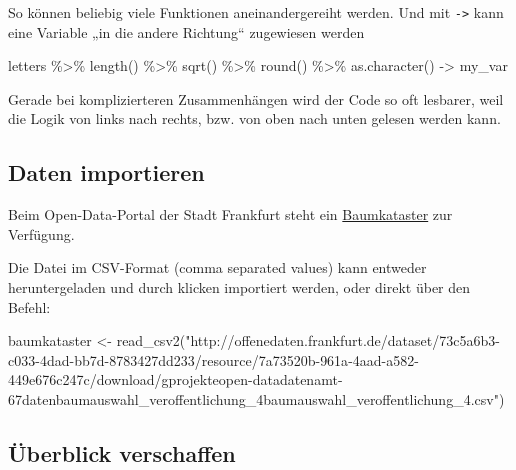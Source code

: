 \documentclass[11pt,german,a4paper]{article}
\newenvironment{Shaded}{\begin{snugshade}}{\end{snugshade}}
\newcommand{\FunctionTok}[1]{\textcolor[rgb]{0.00,0.00,0.00}{#1}}
\newcommand{\NormalTok}[1]{#1}
\newcommand{\OtherTok}[1]{\textcolor[rgb]{0.56,0.35,0.01}{#1}}
\newcommand{\SpecialCharTok}[1]{\textcolor[rgb]{0.00,0.00,0.00}{#1}}
\newcommand{\StringTok}[1]{\textcolor[rgb]{0.31,0.60,0.02}{#1}}
\begin{document}
So können beliebig viele Funktionen aneinandergereiht werden. Und mit \texttt{-\textgreater{}} kann eine Variable „in die andere Richtung`` zugewiesen werden

\begin{Shaded}
\begin{Highlighting}[]
\NormalTok{letters }\SpecialCharTok{\%\textgreater{}\%}
  \FunctionTok{length}\NormalTok{() }\SpecialCharTok{\%\textgreater{}\%}
  \FunctionTok{sqrt}\NormalTok{() }\SpecialCharTok{\%\textgreater{}\%}
  \FunctionTok{round}\NormalTok{() }\SpecialCharTok{\%\textgreater{}\%}
  \FunctionTok{as.character}\NormalTok{() }\OtherTok{{-}\textgreater{}}
\NormalTok{  my\_var}
\end{Highlighting}
\end{Shaded}

Gerade bei komplizierteren Zusammenhängen wird der Code so oft lesbarer, weil die Logik von links nach rechts, bzw. von oben nach unten gelesen werden kann.

\hypertarget{daten-importieren}{%
\subsection{Daten importieren}\label{daten-importieren}}

Beim Open-Data-Portal der Stadt Frankfurt steht ein \href{http://offenedaten.frankfurt.de/dataset/baumkataster-frankfurt-am-main}{Baumkataster} zur Verfügung.

Die Datei im CSV-Format (comma separated values) kann entweder heruntergeladen und durch klicken importiert werden, oder direkt über den Befehl:

\begin{Shaded}
\begin{Highlighting}[]
\NormalTok{baumkataster }\OtherTok{\textless{}{-}} \FunctionTok{read\_csv2}\NormalTok{(}\StringTok{"http://offenedaten.frankfurt.de/dataset/73c5a6b3{-}c033{-}4dad{-}bb7d{-}8783427dd233/resource/7a73520b{-}961a{-}4aad{-}a582{-}449e676c247c/download/gprojekteopen{-}datadatenamt{-}67datenbaumauswahl\_veroffentlichung\_4baumauswahl\_veroffentlichung\_4.csv"}\NormalTok{)}
\end{Highlighting}
\end{Shaded}

\hypertarget{uxfcberblick-verschaffen}{%
\subsection{Überblick verschaffen}\label{uxfcberblick-verschaffen}}
\end{document}
